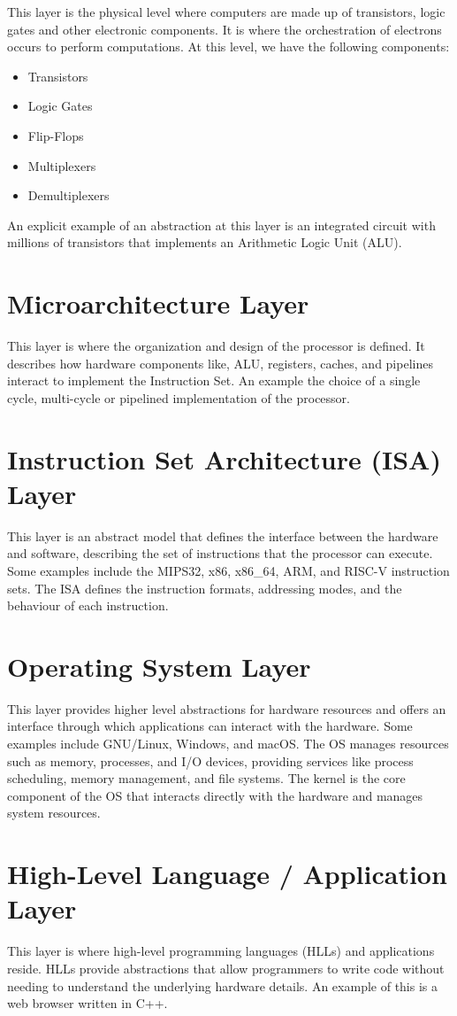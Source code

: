 \documentclass[12pt letter]{report}
\begin{document}
This layer is the physical level where computers are made up of transistors, logic gates and other electronic components. It is
where the orchestration of electrons occurs to perform computations. At this level, we have the following components:
\begin{itemize}
  \item Transistors
  \item Logic Gates
  \item Flip-Flops
  \item Multiplexers
  \item Demultiplexers
\end{itemize}
An explicit example of an abstraction at this layer is an integrated circuit with millions of transistors that implements an Arithmetic Logic Unit (ALU).

\section{Microarchitecture Layer}

This layer is where the organization and design of the processor is defined. It describes how hardware components like, ALU, registers, caches, and pipelines
interact to implement the Instruction Set. An example the choice of a single cycle, multi-cycle or pipelined implementation of the processor.

\section{Instruction Set Architecture (ISA) Layer}

This layer is an abstract model that defines the interface between the hardware and software, describing the set of instructions that the processor can execute.
Some examples include the MIPS32, x86, x86\_64, ARM, and RISC-V instruction sets. The ISA defines the instruction formats, addressing modes, and the behaviour of each instruction.

\section{Operating System Layer}

This layer provides higher level abstractions for hardware resources and offers an interface through which applications can interact with the hardware.
Some examples include GNU/Linux, Windows, and macOS. The OS manages resources such as memory, processes, and I/O devices, providing services like process scheduling, memory management, and file systems.
The kernel is the core component of the OS that interacts directly with the hardware and manages system resources.

\section{High-Level Language / Application  Layer}
This layer is where high-level programming languages (HLLs) and applications reside. HLLs provide abstractions that allow programmers to write code without needing to understand the underlying hardware details.
An example of this is a web browser written in C++.
\end{document}
